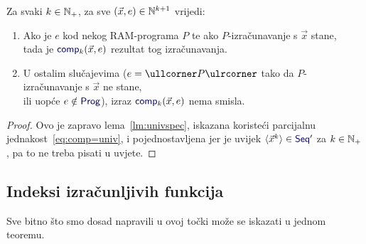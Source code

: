\begin{korolar}[{name=[specifikacija univerzalnih funkcija]}]\label{kor:compspec}
Za svaki $k\in{\mathbb N}_+$, za sve $(\vec x,e)\in{\mathbb N}^{k+1}$ vrijedi:
\begin{enumerate}
    \item\label{tv:comp} Ako je $e$ kod nekog RAM-programa $P$ te ako $P$-izračunavanje s $\vec x$ stane,\\ tada je $\f{comp}_k(\vec x,e)$ rezultat tog izračunavanja.
    \item\label{tv:ncomp} U ostalim slučajevima ($e=\kprog{P}$ tako da $P$-izračunavanje s $\vec x$ ne stane,\\ ili uopće $e\notin\f{Prog}$), izraz $\f{comp}_k(\vec x,e)$ nema smisla.
\end{enumerate}
\end{korolar}
\begin{proof}
Ovo je zapravo lema~\ref{lm:univspec}, iskazana koristeći parcijalnu jednakost~\eqref{eq:comp=univ}, i pojednostavljena jer je uvijek $\langle\vec x^k\rangle\in\f{Seq}'$ za $k\in{\mathbb N}_+$, pa to ne treba pisati u uvjete.
\end{proof}

\subsection{Indeksi izračunljivih funkcija}

Sve bitno što smo dosad napravili u ovoj točki može se iskazati u jednom teoremu.

